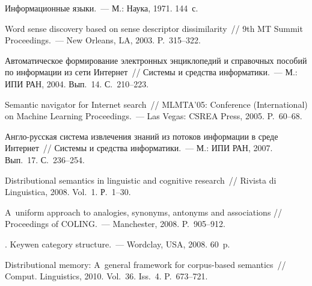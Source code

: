 \begin{multicols}{2}
{\small\frenchspacing
{%
\begin{thebibliography}{99}
 Информационные языки.~--- М.: Наука, 1971. 144~с.

 Word sense discovery based on sense descriptor dissimilarity~// 9th MT Summit 
Proceedings.~--- New Orleans, LA, 2003. P.~315--322.

 Автоматическое формирование электронных 
энциклопедий и справочных пособий по информации из сети Интернет~// Системы и 
средства информатики.~--- М.: ИПИ РАН, 2004. Вып.~14. С.~210--223.

Semantic navigator for Internet search~// MLMTA'05:   Conference (International) on Machine 
Learning Proceedings.~--- Las Vegas: CSREA Press, 2005. P.~60--68.

 Анг\-ло-рус\-ская система извлечения знаний из 
потоков информации в среде Интернет~// Системы и средства информатики.~--- М.: ИПИ 
РАН, 2007. Вып.~17. С.~236--254.
    
 Distributional semantics in linguistic and cognitive research~// Rivista di 
Linguistica, 2008. Vol.~1. Р.~1--30.


 A~uniform approach to analogies, synonyms, antonyms and associations // 
Proceedings of COLING.~--- Manchester, 2008. P.~905--912.

. Keywen category structure.~--- Wordclay, USA, 2008. 60~p.

 Distributional memory: A~general framework for corpus-based 
semantics~// Comput. Linguistics, 2010. Vol.~36. Iss.~4. P.~673--721. 



\end{thebibliography}}}
\end{multicols}
